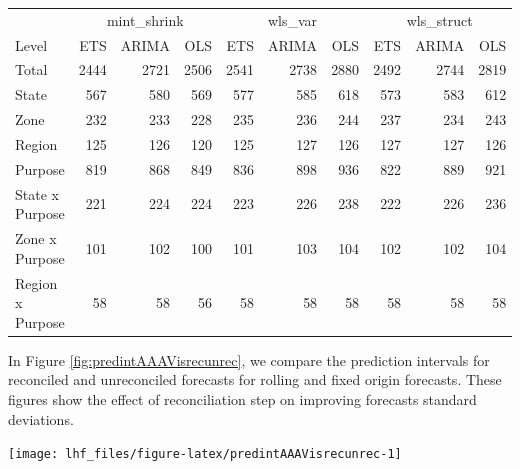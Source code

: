 \documentclass[11pt,a4paper,]{article}
\let\origfigure\figure
\let\endorigfigure\endfigure
\renewenvironment{figure}[1][2] {
    \expandafter\origfigure\expandafter[!htbp]
} {
    \endorigfigure
}
\let\origtable\table
\let\endorigtable\endtable
\renewenvironment{table}[1][2] {
    \expandafter\origtable\expandafter[!htbp]
} {
    \endorigtable
}
\begin{document}
\begin{table}

\caption{\label{tab:Tourismdatadifrecfix}Mean(RMSE) on 2 year test set for ETS, ARIMA and OLS with different reconciliation matrix - Fixed origin - Tourism dataset.}
\centering
\begin{tabular}[t]{lrrrrrrrrr}
\toprule
\multicolumn{1}{c}{} & \multicolumn{3}{c}{mint\_shrink} & \multicolumn{3}{c}{wls\_var} & \multicolumn{3}{c}{wls\_struct} \\
\cmidrule(l{3pt}r{3pt}){2-4} \cmidrule(l{3pt}r{3pt}){5-7} \cmidrule(l{3pt}r{3pt}){8-10}
Level & ETS & ARIMA & OLS & ETS & ARIMA & OLS & ETS & ARIMA & OLS\\
\midrule
Total & 2444 & 2721 & 2506 & 2541 & 2738 & 2880 & 2492 & 2744 & 2819\\
State & 567 & 580 & 569 & 577 & 585 & 618 & 573 & 583 & 612\\
Zone & 232 & 233 & 228 & 235 & 236 & 244 & 237 & 234 & 243\\
Region & 125 & 126 & 120 & 125 & 127 & 126 & 127 & 127 & 126\\
Purpose & 819 & 868 & 849 & 836 & 898 & 936 & 822 & 889 & 921\\
State x Purpose & 221 & 224 & 224 & 223 & 226 & 238 & 222 & 226 & 236\\
Zone x Purpose & 101 & 102 & 100 & 101 & 103 & 104 & 102 & 102 & 104\\
Region x Purpose & 58 & 58 & 56 & 58 & 58 & 58 & 58 & 58 & 58\\
\bottomrule
\end{tabular}
\end{table}

In Figure \ref{fig:predintAAAVisrecunrec}, we compare the prediction intervals for reconciled and unreconciled forecasts for rolling and fixed origin forecasts. These figures show the effect of reconciliation step on improving forecasts standard deviations.

\begin{figure}

{\centering \texttt{[image: lhf\_files/figure-latex/predintAAAVisrecunrec-1]} 

}

\caption{The actual test set for the 'AAAVis' bottom level series compared to the forecasts from reconciled and unreconciled ARIMA, ETS and OLS methods with prediction interval for rolling and fixed origin tourism demand.}\label{fig:predintAAAVisrecunrec}
\end{figure}
\end{document}
